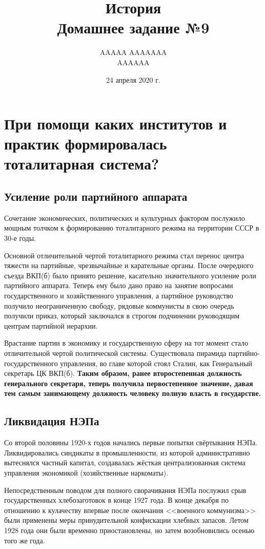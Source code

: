 \documentclass[12pt]{article}
\title{История \\ Домашнее задание №9}
\author{AAAAA AAAAAAA \\ AAAAAA}
\date{24 апреля 2020 г.}
\begin{document}
  \maketitle

  \setcounter{section}{2}
  \section{При помощи каких институтов и практик формировалась тоталитарная система?}
  \subsection{Усиление роли партийного аппарата}
  Сочетание экономических, политических и культурных фактором послужило мощным толчком к формированию тоталитарного режима на территории СССР в 30-е годы.

  Основной отличительной чертой тоталитарного режима стал перенос центра тяжести на партийные, чрезвычайные и карательные органы.
  После очередного съезда ВКП(б) было принято решение, касательно значительного усиление роли партийного аппарата.
  Теперь ему было дано право на занятие вопросами государственного и хозяйственного управления, а партийное руководство получило неограниченную свободу, рядовые коммунисты в свою очередь получили приказ, который заключался в строгом подчинении руководящим центрам партийной иерархии.

  Врастание партии в экономику и государственную сферу на тот момент стало отличительной чертой политической системы.
  Существовала пирамида партийно-государственного управления, во главе которой стоял Сталин, как Генеральный секретарь ЦК ВКП(б).
  \textbf{Таким образом, ранее второстепенная должность генерального секретаря, теперь получила первостепенное значение,
  давая тем самым занимающему должность человеку полную власть в государстве.}

  \subsection{Ликвидация НЭПа}
  Со второй половины 1920-х годов начались первые попытки свёртывания НЭПа.
  Ликвидировались синдикаты в промышленности, из которой административно вытеснялся частный капитал,
  создавалась жёсткая централизованная система управления экономикой (хозяйственные наркоматы).

  Непосредственным поводом для полного сворачивания НЭПа послужил срыв государственных хлебозаготовок в конце 1927 года.
  В конце декабря по отношению к кулачеству впервые после окончания <<военного коммунизма>> были применены меры принудительной конфискации хлебных запасов.
  Летом 1928 года они были временно приостановлены, но затем возобновились осенью того же года.
\end{document}
